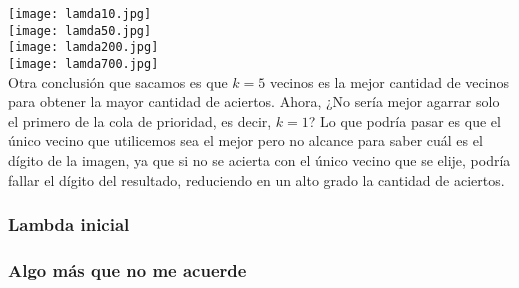 \texttt{[image: lamda10.jpg]}\\
\texttt{[image: lamda50.jpg]}\\
\texttt{[image: lamda200.jpg]}\\
\texttt{[image: lamda700.jpg]}\\


Otra conclusión que sacamos es que $k = 5$ vecinos es la mejor cantidad de vecinos para obtener la mayor cantidad de aciertos. 
Ahora, ¿No sería mejor agarrar solo el primero de la cola de prioridad, es decir, $k = 1$? 
Lo que podría pasar es que el único vecino que utilicemos sea el mejor pero no alcance para saber cuál es el dígito de la imagen, ya que si no se acierta con el único vecino que se elije,  podría fallar el dígito del resultado, reduciendo en un alto grado la cantidad de aciertos.

\subsubsection{Lambda inicial}

\subsubsection{Algo más que no me acuerde}
